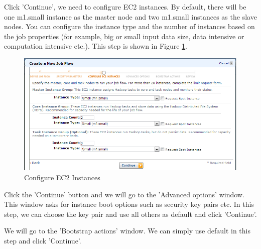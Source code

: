 Click 'Continue', we need to configure EC2 instances. By default, there will be one m1.small instance as the master node and two m1.small instances as the slave nodes. You can configure the instance type and the number of instances based on the job properties (for example, big or small input data size, data intensive or computation intensive etc.). This step is shown in Figure \ref{fig:aws.elasticmapred.config.instance}.
\begin{figure}[ht]
  \centering
  \includegraphics[width=.8\textwidth]{figs/5163os_08_26.png}
  \caption{Configure EC2 Instances}\label{fig:aws.elasticmapred.config.instance}
\end{figure} 
Click the 'Continue' button and we will go to the 'Advanced options' window. This window asks for instance boot options such as security key pairs etc. In this step, we can choose the key pair and use all others as default and click 'Continue'.

We will go to the 'Bootstrap actions' window. We can simply use default in this step and click 'Continue'.

